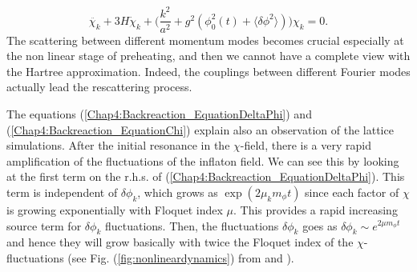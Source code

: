 \documentclass[11pt,a4paper,twoside]{book}
\begin{document}
\begin{equation}
\label{Chap4:Backreaction_deltaChiHartree}
\ddot{\chi_{k}} + 3H \dot{\chi}_{k} + \Bigg(\frac{k^{2}}{a^{2}} + g^{2}(\phi_{0}^{2}(t) + \langle \delta \phi^{2}\rangle  )\Bigg)\chi_{k}=0.
\end{equation}
The scattering between different momentum modes becomes crucial especially  at the non linear stage of preheating, and then we cannot have a complete view with the Hartree approximation. Indeed, the couplings between different Fourier modes actually lead  the rescattering process.

The equations (\ref{Chap4:Backreaction_EquationDeltaPhi}) and (\ref{Chap4:Backreaction_EquationChi}) explain also an observation of the lattice simulations. After the initial resonance in the $\chi$-field, there is a very rapid amplification of the fluctuations of the inflaton field. We can see this by looking at the first term on the r.h.s. of (\ref{Chap4:Backreaction_EquationDeltaPhi}). This term is independent of $\delta \phi_{k}$, which grows as $ \exp(2\mu_{k}m_{\phi}t) $ since each factor of $\chi$ is growing  exponentially with Floquet index $\mu$. This provides a rapid increasing source term for $\delta \phi_{k} $ fluctuations. Then, the fluctuations $\delta \phi_{k}$ goes as $ \delta \phi_{k} \sim e^{2\mu m_{\phi}t} $ and hence they  will grow basically with twice the Floquet index of the $\chi$-fluctuations (see Fig. (\ref{fig:nonlineardynamics}) from \cite{Chap4:Reference2} and \cite{InflationDynamicsAndReheating:chap1}).  
\end{document}
